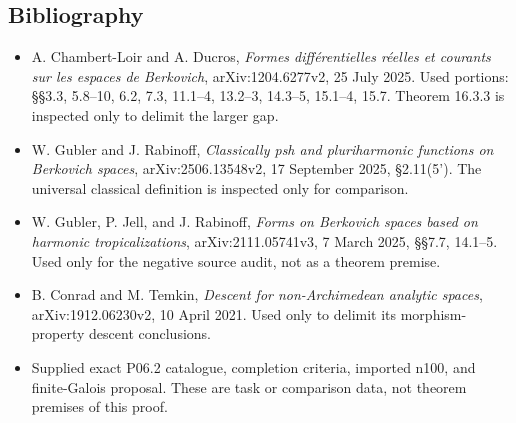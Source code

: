 \documentclass[
  11pt,
]{article}
\providecommand{\tightlist}{%
  \setlength{\itemsep}{0pt}\setlength{\parskip}{0pt}}
\begin{document}
\subsection{Bibliography}\label{bibliography}

\begin{itemize}
\tightlist
\item
  A. Chambert-Loir and A. Ducros, \emph{Formes différentielles réelles
  et courants sur les espaces de Berkovich}, arXiv:1204.6277v2, 25 July
  2025. Used portions: §§3.3, 5.8--10, 6.2, 7.3, 11.1--4, 13.2--3,
  14.3--5, 15.1--4, 15.7. Theorem 16.3.3 is inspected only to delimit
  the larger gap.
\item
  W. Gubler and J. Rabinoff, \emph{Classically psh and pluriharmonic
  functions on Berkovich spaces}, arXiv:2506.13548v2, 17 September 2025,
  §2.11(5'). The universal classical definition is inspected only for
  comparison.
\item
  W. Gubler, P. Jell, and J. Rabinoff, \emph{Forms on Berkovich spaces
  based on harmonic tropicalizations}, arXiv:2111.05741v3, 7 March 2025,
  §§7.7, 14.1--5. Used only for the negative source audit, not as a
  theorem premise.
\item
  B. Conrad and M. Temkin, \emph{Descent for non-Archimedean analytic
  spaces}, arXiv:1912.06230v2, 10 April 2021. Used only to delimit its
  morphism-property descent conclusions.
\item
  Supplied exact P06.2 catalogue, completion criteria, imported n100,
  and finite-Galois proposal. These are task or comparison data, not
  theorem premises of this proof.
\end{itemize}
\end{document}

